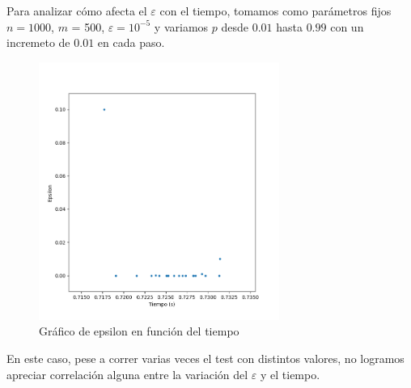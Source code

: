 Para analizar c\'omo afecta el $\varepsilon$ con el tiempo, tomamos como par\'ametros fijos $n = 1000$, $m$ = 500,
$\varepsilon = 10^{-5}$ y variamos $p$ desde $0.01$ hasta $0.99$ con un incremeto de $0.01$ en cada paso.
\begin{figure}[H] 
\centering
\includegraphics[width=0.7\textwidth]{img/Eps.png}
\caption{Gr\'afico de epsilon en funci\'on del tiempo}
\label{fig:eps}
\end{figure}

En este caso, pese a correr varias veces el test con distintos valores, no logramos apreciar correlaci\'on alguna entre la variaci\'on del $\varepsilon$ y el
tiempo.